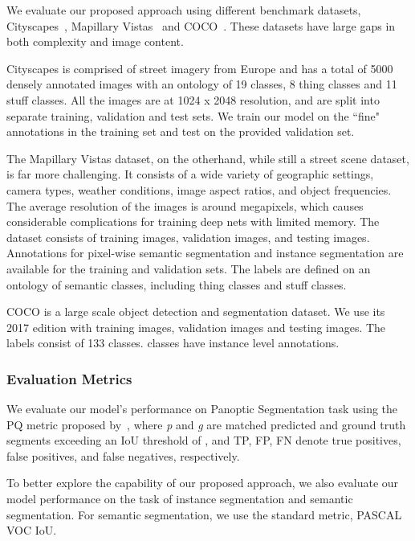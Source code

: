 \documentclass[10pt,twocolumn]{article}
\begin{document}
We evaluate our proposed approach using different benchmark datasets, Cityscapes~\cite{Cordts2016Cityscapes}, Mapillary Vistas~\cite{neuhold2017mapillary-vistas} and COCO~\cite{lin2014microsoft}.
These datasets have large gaps in both complexity and image content.


Cityscapes is comprised of street imagery from Europe and has a total of 5000 densely annotated images with an ontology of 19 classes, 8 thing classes and 11 stuff classes. All the images are at 1024 x 2048 resolution, and are split into separate training, validation and test sets. We train our model on the ``fine" annotations in the training set and test on the provided validation set.

The Mapillary Vistas dataset, on the otherhand, while still a street scene dataset, is far more challenging. It consists of a wide variety of geographic settings, camera types, weather conditions, image aspect ratios, and object frequencies. The average resolution of the images is around  megapixels, which causes considerable complications for training deep nets with limited memory. The dataset consists of  training images,  validation images, and  testing images. Annotations for pixel-wise semantic segmentation and instance segmentation are available for the training and validation sets. The labels are defined on an ontology of  semantic classes, including  thing classes and  stuff classes. 

{COCO} is a large scale object detection and segmentation dataset. We use its 2017 edition with  training images,  validation images and  testing images. The labels consist of 133 classes.  classes have instance level annotations.







\subsubsection*{Evaluation Metrics}
     We evaluate our model's performance on Panoptic Segmentation task using the \ac{PQ} metric proposed by~\cite{kirillov2018panoptic}, 
    where \textit{p} and \textit{g} are matched predicted and ground truth segments exceeding an IoU threshold of , and TP, FP, FN denote true positives, false positives, and false negatives, respectively.


    To better explore the capability of our proposed approach, we also evaluate our model performance on the task of instance segmentation and semantic segmentation. 
    For semantic segmentation, we use the standard metric, PASCAL VOC \ac{IoU}.
\end{document}
